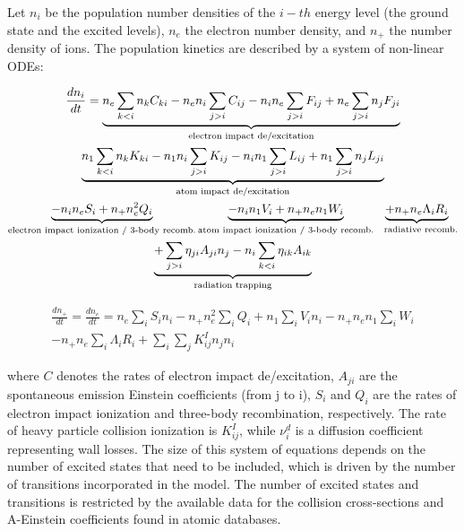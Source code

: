 Let $n_i$ be the population number densities of the $i-th$ energy level (the ground state and the excited levels), $n_e$ the electron number density, and $n_+$ the number density of ions.  The population kinetics are described by a system of non-linear ODEs: 

\begin{multline}
    \label{eq:number_densities_ex}
    \frac{d n_i}{dt} = 
    \underbrace{ n_e \sum_{k<i} n_k C_{ki} -n_e n_i \sum_{j>i} C_{ij} - n_i n_e \sum_{j>i} F_{ij} + n_e \sum_{j>i} n_j F_{ji} }_{\text{electron impact de/excitation}} \\
    \underbrace{ n_1 \sum_{k<i} n_k K_{ki} -n_1 n_i \sum_{j>i} K_{ij} - n_i n_1 \sum_{j>i} L_{ij} + n_1 \sum_{j>i} n_j L_{ji} }_{\text{atom impact de/excitation}}    \\
    \underbrace{ - n_i n_e S_i    + n_+ n_e^2 Q_i  }_\text{electron impact ionization /  3-body recomb.}
    \underbrace{ - n_i n_1 V_i    + n_+ n_e n_1 W_i  }_\text{atom impact ionization /  3-body recomb.}
    \underbrace{ + n_+ n_e \Lambda_i R_i  }_\text{ \, radiative recomb.} \\
    \underbrace{ + \sum_{j>i} \eta_{ji} A_{ji} n_j  - n_i \sum_{k<i} \eta_{ik} A_{ik} }_{\text{radiation trapping}}
\end{multline}


\begin{multline}
    \label{eq:number_densities_ion}
    \frac{d n_+}{dt} =  \frac{d n_e}{dt}  =   n_e \sum_i S_i n_i - n_+ n_e^2 \sum_i Q_i  + n_1 \sum_i V_i n_i - n_+ n_e n_1 \sum_i W_i \\
    - n_+ n_e \sum_i \Lambda_i R_i + \sum_{i} \sum_{j} K_{ij}^I n_j n_i
\end{multline}

\noindent where $C$ denotes the rates of electron impact de/excitation, $A_{ji}$ are the spontaneous emission Einstein coefficients (from j to i), $S_i$  and $Q_i$  are the rates of electron impact ionization and three-body recombination, respectively. The rate of heavy particle collision ionization is $K_{ij}^I$, while $\nu_i^d $ is a diffusion coefficient representing wall losses.    The size of this system of equations depends on the number of excited states that need to be included, which is driven by the number of transitions incorporated in the model. The number of excited states and transitions is restricted by the available data for the collision cross-sections and A-Einstein coefficients found in atomic databases.    

